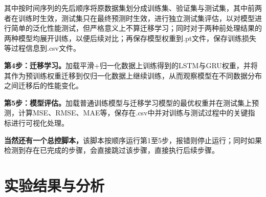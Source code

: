 \documentclass[12pt, oneside, a4paper]{ctexart}
\begin{document}
\par{}
其中按时间序列的先后顺序将原数据集划分成训练集、验证集与测试集，其中前两者在训练时生效，测试集只在最终预测时生效，进行独立测试集评估，以对模型进行简单的泛化性能测试，但严格意义上不算迁移学习；同时对于两种前处理结果的两种模型均展开训练，以便后续对比；再保存模型权重到.pt文件，保存训练损失等过程信息到.csv文件。
\par{}
\textbf{第4步：迁移学习。}加载平滑+归一化数据上训练得到的LSTM与GRU权重，并将其作为预训练权重迁移到仅归一化数据上继续训练，从而观察模型在不同数据分布之间迁移后的性能变化。
\par{}
\textbf{第5步：模型评估。}加载普通训练模型与迁移学习模型的最优权重并在测试集上预测，计算MSE、RMSE、MAE等，保存在.csv中并对训练与测试过程中的关键指标进行可视化处理。
\par{}
\textbf{当然还有一个总控脚本，}该脚本按顺序运行第1至5步，报错则停止运行；同时如果检测到存在已完成的步骤，会直接跳过该步骤，直接执行后续步骤。
\par{}
\quad{}
\par{}
\section{实验结果与分析}
\end{document}
